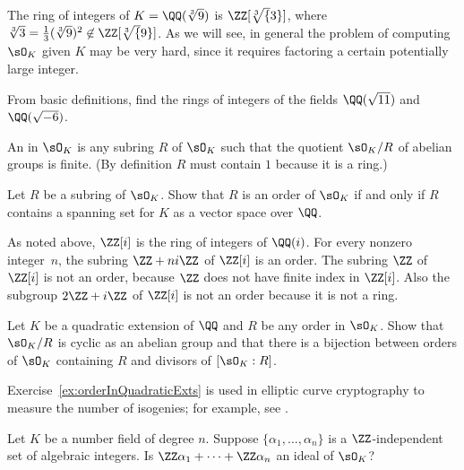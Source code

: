 \begin{example}
  The ring of integers of $K=\QQ(\sqrt[3]{9})$ is $\ZZ[\sqrt[3]{3}]$,
  where $\sqrt[3]{3}=\frac{1}{3}(\sqrt[3]{9})^2 \not \in \ZZ[\sqrt[3]{9}]$.
  As we will see, in general the problem of computing $\sO_K$ given $K$
  may be very hard, since it requires factoring a certain potentially
  large integer.
\end{example}

\begin{exercise}
  From basic definitions, find the rings of integers of the fields
  $\QQ(\sqrt{11})$ and $\QQ(\sqrt{-6})$.
\end{exercise}

\begin{definition}[Order]\label{defn:order}
  An  in $\sO_K$ is any subring $R$ of $\sO_K$ such that
  the quotient $\sO_K/R$ of abelian groups is finite.
  (By definition $R$ must contain $1$ because it is a ring.)
\end{definition}

\begin{exercise}
  Let $R$ be a subring of $\sO_K$. Show that $R$ is an order of $\sO_K$
  if and only if $R$ contains a spanning set for $K$ as a vector space
  over $\QQ$.
\end{exercise}

As noted above, $\ZZ[i]$ is the ring of integers of $\QQ(i)$.  For every
nonzero integer~$n$, the subring $\ZZ+ni\ZZ$ of $\ZZ[i]$ is an order.
The subring $\ZZ$ of $\ZZ[i]$ is not an order, because $\ZZ$ does not
have finite index in $\ZZ[i]$.  Also the subgroup $2\ZZ + i\ZZ$ of
$\ZZ[i]$ is not an order because it is not a ring.

\begin{exercise}\label{ex:orderInQuadraticExts}
  Let $K$ be a quadratic extension of $\QQ$
  and $R$ be any order in $\sO_K$.
  Show that $\sO_K/R$ is cyclic as an abelian group
  and that there is a bijection between orders of
  $\sO_K$ containing $R$ and divisors of $[\sO_K:R]$.
\end{exercise}

\begin{remark}
  Exercise~\ref{ex:orderInQuadraticExts} is used in
  elliptic curve cryptography to measure the number
  of isogenies; for example, see \cite[\S11.2]{Koblitz2011781}.
\end{remark}

\begin{exercise} %
  Let $K$ be a number field of degree $n$. Suppose $\{\alpha_1,\dots,\alpha_n\}$ is a $\ZZ$-independent set of algebraic integers. Is $\ZZ\alpha_1 + \cdots + \ZZ\alpha_n$ an ideal of $\sO_K$?
\end{exercise}


